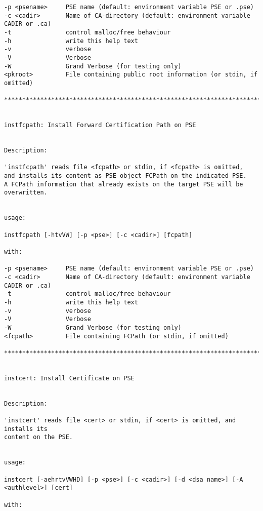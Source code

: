 {\begin{verbatim}
-p <psename>     PSE name (default: environment variable PSE or .pse)
-c <cadir>       Name of CA-directory (default: environment variable CADIR or .ca)
-t               control malloc/free behaviour
-h               write this help text
-v               verbose
-V               Verbose
-W               Grand Verbose (for testing only)
<pkroot>         File containing public root information (or stdin, if omitted)

****************************************************************************************


instfcpath: Install Forward Certification Path on PSE


Description:

'instfcpath' reads file <fcpath> or stdin, if <fcpath> is omitted,
and installs its content as PSE object FCPath on the indicated PSE.
A FCPath information that already exists on the target PSE will be overwritten.


usage:

instfcpath [-htvVW] [-p <pse>] [-c <cadir>] [fcpath]

with:

-p <psename>     PSE name (default: environment variable PSE or .pse)
-c <cadir>       Name of CA-directory (default: environment variable CADIR or .ca)
-t               control malloc/free behaviour
-h               write this help text
-v               verbose
-V               Verbose
-W               Grand Verbose (for testing only)
<fcpath>         File containing FCPath (or stdin, if omitted)

****************************************************************************************


instcert: Install Certificate on PSE


Description:

'instcert' reads file <cert> or stdin, if <cert> is omitted, and installs its
content on the PSE.


usage:

instcert [-aehrtvVWHD] [-p <pse>] [-c <cadir>] [-d <dsa name>] [-A <authlevel>] [cert]

with:


\end{verbatim}}

